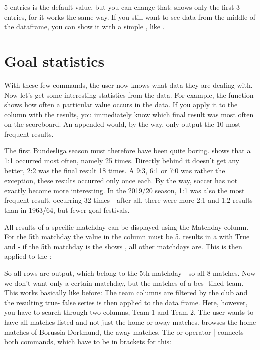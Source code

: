 \medskip

5 entries is the default value, but you can change that:  shows only the first 3 entries, for  it works the same way. If you still want to see data from the middle of the dataframe, you can show it with a simple , like .


\section{Goal statistics}

With these few commands, the user now knows what data they are dealing with. Now let's get some interesting statistics from the data. For example, the  function shows how often a particular value occurs in the data. If you apply it to the  column with the results, you immediately know which final result was most often on the scoreboard. An appended  would, by the way, only output the 10 most frequent results.

The first Bundesliga season must therefore have been quite boring.  shows that a 1:1 occurred most often, namely 25 times. Directly behind it doesn't get any better, 2:2 was the final result 18 times. A 9:3, 6:1 or 7:0 was rather the exception, these results occurred only once each. By the way, soccer has not exactly become more interesting. In the 2019/20 season, 1:1 was also the most frequent result, occurring 32 times - after all, there were more 2:1 and 1:2 results than in 1963/64, but fewer goal festivals.

All results of a specific matchday can be displayed using the Matchday column. For the 5th matchday the value in the column must be 5.  results in a  with True and  - if the 5th matchday is the  shows , all other matchdays are. This  is then applied to the :


So all rows are output, which belong to the 5th matchday - so all 8 matches. Now we don't want only a certain matchday, but the matches of a bes- tined team. This works basically like before: The team columns are filtered by the club and the resulting true- false series is then applied to the data frame. Here, however, you have to search through two columns, Team 1 and Team 2. The user wants to have all matches listed and not just the home or away matches.
browses the home matches of Borussia Dortmund,  the away matches. The or operator | connects both commands, which have to be in brackets for this:

